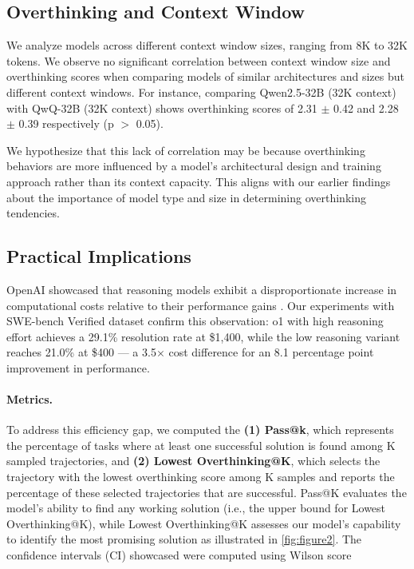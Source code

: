 \subsection{Overthinking and Context Window}
We analyze models across different context window sizes, ranging from 8K to 32K tokens. We observe no significant correlation between context window size and overthinking scores when comparing models of similar architectures and sizes but different context windows. For instance, comparing Qwen2.5-32B (32K context) with QwQ-32B (32K context) shows overthinking scores of 2.31 $\pm$ 0.42 and 2.28 $\pm$ 0.39 respectively (p $>$ 0.05).

We hypothesize that this lack of correlation may be because overthinking behaviors are more influenced by a model's architectural design and training approach rather than its context capacity. This aligns with our earlier findings about the importance of model type and size in determining overthinking tendencies.

\subsection{Practical Implications}

OpenAI showcased that reasoning models exhibit a disproportionate increase in computational costs relative to their performance gains \cite{arcprize2024oai}. Our experiments with SWE-bench Verified dataset confirm this observation: o1 with high reasoning effort achieves a 29.1\% resolution rate at \$1,400, while the low reasoning variant reaches 21.0\% at \$400 — a 3.5$\times$ cost difference for an 8.1 percentage point improvement in performance.

\paragraph{Metrics.} To address this efficiency gap, we computed the \textbf{(1) Pass@k}, which represents the percentage of tasks where at least one successful solution is found among K sampled trajectories, and \textbf{(2) Lowest Overthinking@K}, which selects the trajectory with the lowest overthinking score among K samples and reports the percentage of these selected trajectories that are successful. Pass@K evaluates the model’s ability to find any working solution (i.e., the upper bound for Lowest Overthinking@K), while Lowest Overthinking@K assesses our model's capability to identify the most promising solution as illustrated in \cref{fig:figure2}. The confidence intervals (CI) showcased were computed using Wilson score \cite{wallis2013binomial}

